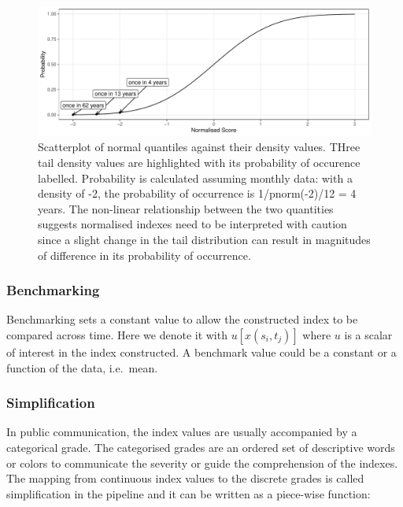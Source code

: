 \documentclass[
]{article}
\begin{document}
\begin{figure}

{\centering \includegraphics{paper_files/figure-pdf/fig-normalising-1.pdf}

}

\caption{\label{fig-normalising}Scatterplot of normal quantiles against
their density values. THree tail density values are highlighted with its
probability of occurence labelled. Probability is calculated assuming
monthly data: with a density of -2, the probability of occurrence is
1/pnorm(-2)/12 = 4 years. The non-linear relationship between the two
quantities suggests normalised indexes need to be interpreted with
caution since a slight change in the tail distribution can result in
magnitudes of difference in its probability of occurrence.}

\end{figure}

\hypertarget{benchmarking}{%
\subsubsection{Benchmarking}\label{benchmarking}}

Benchmarking sets a constant value to allow the constructed index to be
compared across time. Here we denote it with \(u[x(s_i, t_j)]\) where
\(u\) is a scalar of interest in the index constructed. A benchmark
value could be a constant or a function of the data, i.e.~mean.

\hypertarget{simplification}{%
\subsubsection{Simplification}\label{simplification}}

In public communication, the index values are usually accompanied by a
categorical grade. The categorised grades are an ordered set of
descriptive words or colors to communicate the severity or guide the
comprehension of the indexes. The mapping from continuous index values
to the discrete grades is called simplification in the pipeline and it
can be written as a piece-wise function:
\end{document}
